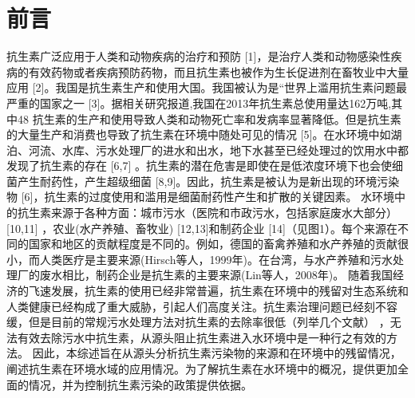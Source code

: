 \documentclass{SCIS2020cn}
\begin{document}
\maketitle
\makeentitle

\twocolumn[]
\setcounter{section}{-1}
\section{前言}
抗生素广泛应用于人类和动物疾病的治疗和预防 [1]，是治疗人类和动物感染性疾病的有效药物或者疾病预防药物，而且抗生素也被作为生长促进剂在畜牧业中大量应用 [2]。我国是抗生素生产和使用大国。我国被认为是“世界上滥用抗生素问题最严重的国家之一 [3]。据相关研究报道,我国在2013年抗生素总使用量达162万吨,其中48%
抗生素的生产和使用导致人类和动物死亡率和发病率显著降低。但是抗生素的大量生产和消费也导致了抗生素在环境中随处可见的情况 [5]。在水环境中如湖泊、河流、水库、污水处理厂的进水和出水，地下水甚至已经处理过的饮用水中都发现了抗生素的存在 [6,7] 。抗生素的潜在危害是即使在是低浓度环境下也会使细菌产生耐药性，产生超级细菌 [8,9]。因此，抗生素是被认为是新出现的环境污染物 [6]，抗生素的过度使用和滥用是细菌耐药性产生和扩散的关键因素。
水环境中的抗生素来源于各种方面：城市污水（医院和市政污水，包括家庭废水大部分） [10,11] ，农业(水产养殖、畜牧业) [12,13]和制药企业 [14]（见图1）。每个来源在不同的国家和地区的贡献程度是不同的。例如，德国的畜禽养殖和水产养殖的贡献很小，而人类医疗是主要来源(Hirsch等人，1999年)。在台湾，与水产养殖和污水处理厂的废水相比，制药企业是抗生素的主要来源(Lin等人，2008年)。
随着我国经济的飞速发展，抗生素的使用已经非常普遍，抗生素在环境中的残留对生态系统和人类健康已经构成了重大威胁，引起人们高度关注。抗生素治理问题已经刻不容缓，但是目前的常规污水处理方法对抗生素的去除率很低（列举几个文献） ，无法有效去除污水中抗生素，从源头阻止抗生素进入水环境中是一种行之有效的方法。
因此，本综述旨在从源头分析抗生素污染物的来源和在环境中的残留情况，阐述抗生素在环境水域的应用情况。为了解抗生素在水环境中的概况，提供更加全面的情况，并为控制抗生素污染的政策提供依据。


\end{document}
